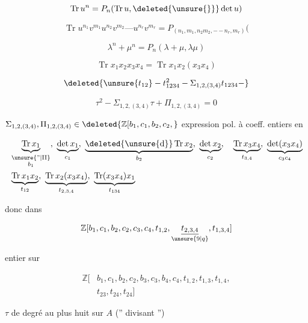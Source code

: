 
\[
 \operatorname{Tr}u^n=P_n(\operatorname{Tr}u,\deleted{\unsure{\}}}\det u)
\]

\[
 \operatorname{Tr}u^{n_1}v^{m_1}u^{n_2}v^{m_2}\mathord{\text{---}}u^{n_r}v^{m_r}
 =P_{(n_1,m_1,n_2m_2,\mathord{-}\,\mathord{-}\,n_r,m_r)}(
\]

\[
 \lambda^n+\mu^n=P_n(\lambda+\mu,\lambda\mu)
\]

\[
 \operatorname{Tr}x_1x_2x_3x_4=\operatorname{Tr}x_1x_2(x_3x_4)
\]

\[
 \deleted{\unsure{t_{12}}-t_{1234}^{2}-\Sigma_{1,2,(3,4)}t_{1234}-}
\]

\[
 \tau^2-\Sigma_{1,2,(3,4)}\tau+\Pi_{1,2,(3,4)}=0
\]

$\Sigma_{1,2,(3,4)},\Pi_{1,2,(3,4)}\in\deleted{\mathbb Z[b_1,c_1,b_2,c_2,}$ expression pol. à coeff. entiers en

\[
 \begin{aligned}
 &\underbrace{\operatorname{Tr}x_1}_{\substack{\unsure{\text{''}|\mathrm{II}}\\ b_1}},\ \underbrace{\det x_1}_{c_1},\
 \underbrace{\deleted{\unsure{\mathrm d}}\operatorname{Tr}x_2}_{b_2},\
 \underbrace{\det x_2}_{c_2},\quad\underbrace{\operatorname{Tr}x_3x_4}_{t_{3,4}},\
 \underbrace{\det(x_3x_4)}_{c_3c_4}\\
 &\underbrace{\operatorname{Tr}x_1x_2}_{t_{12}},\
 \underbrace{\operatorname{Tr}x_2(x_3x_4)}_{t_{2,3,4}},\
 \underbrace{\operatorname{Tr}(x_3x_4)x_1}_{t_{134}}
 \end{aligned}
\]

donc dans

\[
 \mathbb Z[b_1,c_1,b_2,c_2,c_3,c_4,t_{1,2},
 \underset{\unsure{9|q}}{\underline{t_{2,3,4}}},t_{1,3,4}]
\]

entier sur

\[
 \begin{aligned}
 \mathbb Z[&b_1,c_1,b_2,c_2,b_3,c_3,b_4,c_4,t_{1,2},t_{1,3},t_{1,4},\\
 &t_{23},t_{24},t_{24}]
 \end{aligned}
\]

$\tau$ de degré au plus huit sur $A$ ('' divisant '')

